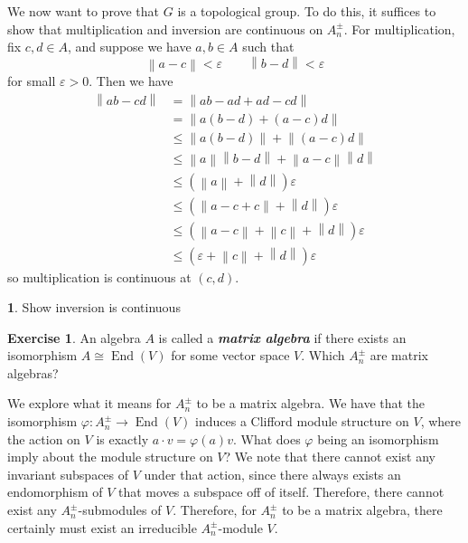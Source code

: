 \documentclass[psamsfonts]{amsart}
\theoremstyle{definition}
\newtheorem{exer}[thm]{Exercise}
\newtheorem*{TODO}{\ib{TODO}}
\theoremstyle{remark}
\newcommand{\ib}[1]{\textbf{\textit{#1}}}
\newcommand{\norm}[1]{\left\lVert#1\right\rVert}
\DeclareMathOperator{\End}{End}
\begin{document}
We now want to prove that $G$ is a topological group. To do this, it suffices to show that multiplication and inversion are continuous on $A^\pm_n$. For multiplication, fix $c,d \in A$, and suppose we have $a,b \in A$ such that
$$\norm{a - c} < \varepsilon \qquad \norm{b -d } < \varepsilon $$
for small $\varepsilon > 0$. Then we have 
\begin{align*}
\norm{ab - cd} &= \norm{ab - ad + ad - cd} \\
&= \norm{a(b-d) + (a-c)d} \\
&\leq \norm{a(b-d)} + \norm{(a-c)d} \\
&\leq \norm{a}\norm{b-d} + \norm{a-c}\norm{d} \\
&\leq (\norm{a} + \norm{d})\varepsilon \\
& \leq (\norm{a - c + c} + \norm{d})\varepsilon \\
&\leq (\norm{a - c} + \norm{c} + \norm{d})\varepsilon \\
&\leq (\varepsilon + \norm{c} + \norm{d})\varepsilon
\end{align*}
so multiplication is continuous at $(c,d)$. 
%
\begin{TODO}
Show inversion is continuous
\end{TODO}
%
\begin{exer}
An algebra $A$ is called a \ib{matrix algebra} if there exists an isomorphism $A \cong \End(V)$ for some vector space $V$. Which $A^\pm_n$ are matrix algebras?
\end{exer}
We explore what it means for $A^\pm_n$ to be a matrix algebra. We have that the isomorphism $\varphi: A^\pm_n \to \End(V)$ induces a Clifford module structure on $V$, where the action on $V$ is exactly $a \cdot v = \varphi(a)v$. What does $\varphi$ being an isomorphism imply about the module structure on $V$? We note that there cannot exist any invariant subspaces of $V$ under that action, since there always exists an endomorphism of $V$ that moves a subspace off of itself. Therefore, there cannot exist any $A^\pm_n$-submodules of $V$. Therefore, for $A^\pm_n$ to be a matrix algebra, there certainly must exist an irreducible $A^\pm_n$-module $V$.
\end{document}
